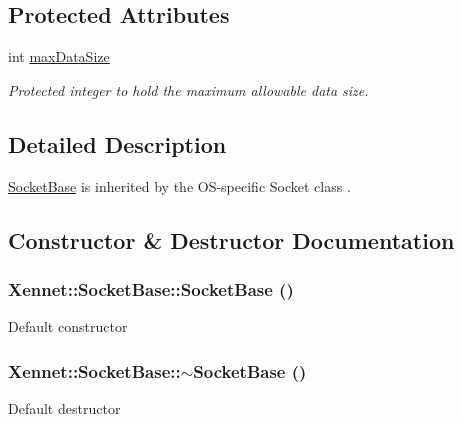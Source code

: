 \subsection*{Protected Attributes}
\begin{CompactItemize}
\item 
int \hyperlink{classXennet_1_1SocketBase_32530d6e56d4aff4696a76f9588b5f07}{maxDataSize}
\begin{CompactList}\small\item\em Protected integer to hold the maximum allowable data size. \item\end{CompactList}\end{CompactItemize}


\subsection{Detailed Description}
\hyperlink{classXennet_1_1SocketBase}{SocketBase} is inherited by the OS-specific Socket class . 

\subsection{Constructor \& Destructor Documentation}
\hypertarget{classXennet_1_1SocketBase_de4341bc034247a1ef5620914613ebbc}{
\subsubsection{\setlength{\rightskip}{0pt plus 5cm}Xennet::SocketBase::SocketBase ()}}
\label{classXennet_1_1SocketBase_de4341bc034247a1ef5620914613ebbc}


Default constructor \hypertarget{classXennet_1_1SocketBase_7bd3b275e3e62943c9220e56b17e146a}{
\subsubsection{\setlength{\rightskip}{0pt plus 5cm}Xennet::SocketBase::$\sim$SocketBase ()}}
\label{classXennet_1_1SocketBase_7bd3b275e3e62943c9220e56b17e146a}


Default destructor 

